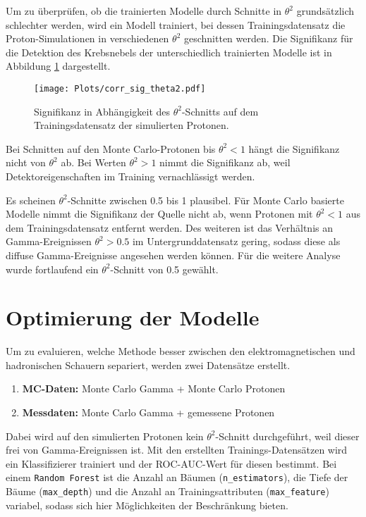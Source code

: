 Um zu überprüfen, ob die trainierten Modelle durch Schnitte in $\theta^{2}$ grundsätzlich schlechter werden, wird ein Modell trainiert, bei dessen Trainingsdatensatz die Proton-Simulationen in verschiedenen $\theta^{2}$ geschnitten werden. 
Die Signifikanz für die Detektion des Krebsnebels der unterschiedlich trainierten Modelle ist in Abbildung \ref{fig:corrtheta} dargestellt.
\begin{figure}[H]
  \centering
  \texttt{[image: Plots/corr\_sig\_theta2.pdf]}
  \caption{Signifikanz in Abhängigkeit des $\theta^{2}$-Schnitts auf dem Trainingsdatensatz der simulierten Protonen.}
  \label{fig:corrtheta}
\end{figure}
Bei Schnitten auf den Monte Carlo-Protonen bis $\theta^{2} < 1$ hängt die Signifikanz nicht von $\theta^{2}$ ab.
Bei Werten $\theta^{2} > 1$ nimmt die Signifikanz ab, weil Detektoreigenschaften im Training vernachlässigt werden.

Es scheinen $\theta^{2}$-Schnitte zwischen \num{0.5} bis \num{1} plausibel. 
Für Monte Carlo basierte Modelle nimmt die Signifikanz der Quelle nicht ab, wenn Protonen mit $\theta^{2} < \num{1}$ aus dem Trainingsdatensatz entfernt werden. 
Des weiteren ist das Verhältnis an Gamma-Ereignissen $\theta^{2} > \num{0.5}$ im Untergrunddatensatz gering, sodass diese als diffuse Gamma-Ereignisse angesehen werden können. 
Für die weitere Analyse wurde fortlaufend ein $\theta^{2}$-Schnitt von \num{0.5} gewählt. 
\newpage
\section{Optimierung der Modelle}
Um zu evaluieren, welche Methode besser zwischen den elektromagnetischen und hadronischen Schauern separiert, werden zwei Datensätze erstellt. 
\begin{enumerate}
  \item \textbf{MC-Daten:} Monte Carlo Gamma + Monte Carlo Protonen
  \item \textbf{Messdaten:} Monte Carlo Gamma + gemessene Protonen 
\end{enumerate}
Dabei wird auf den simulierten Protonen kein $\theta^{2}$-Schnitt durchgeführt, weil dieser frei von Gamma-Ereignissen ist.
Mit den erstellten Trainings-Datensätzen wird ein Klassifizierer trainiert und der ROC-AUC-Wert für diesen bestimmt.
Bei einem \texttt{Random Forest} ist die Anzahl an Bäumen (\texttt{n\_estimators}), die Tiefe der Bäume (\texttt{max\_depth}) und die Anzahl an Trainingsattributen (\texttt{max\_feature}) variabel, sodass sich hier Möglichkeiten der Beschränkung bieten.

